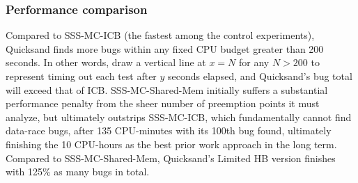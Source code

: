 
\subsubsection{Performance comparison}

Compared to SSS-MC-ICB (the fastest among the control experiments),
Quicksand finds more bugs within any fixed CPU budget greater than 200 seconds.
In other words, draw a vertical line at $x=N$ for any $N>200$ to represent timing out each test after $y$ seconds elapsed,
and Quicksand's bug total will exceed that of ICB.
SSS-MC-Shared-Mem initially suffers a substantial performance penalty from the sheer number of preemption points it must analyze,
but ultimately outstrips SSS-MC-ICB, which fundamentally cannot find data-race bugs,
after 135 CPU-minutes with its 100th bug found,
ultimately finishing the 10 CPU-hours as the best prior work approach in the long term.
Compared to SSS-MC-Shared-Mem, Quicksand's Limited HB version
finishes with 125\% as many bugs in total.

